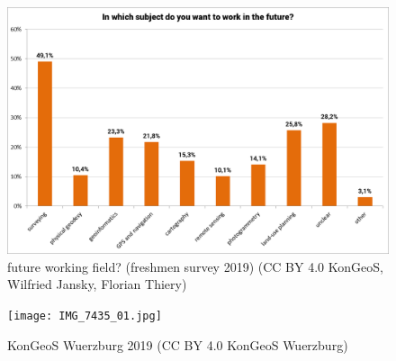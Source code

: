 \documentclass[a4paper]{article}
\begin{document}
\begin{figure}[!ht]
\begin{center}
\includegraphics[width=12cm]{wg-ys4.png}
\caption{future working field? (freshmen survey 2019) (CC BY 4.0 KonGeoS, Wilfried Jansky, Florian Thiery)}
\label{Abb7}
\end{center}
\end{figure}

\begin{figure}[!ht]
\begin{center}
\texttt{[image: IMG\_7435\_01.jpg]}
\caption{KonGeoS Wuerzburg 2019 (CC BY 4.0 KonGeoS Wuerzburg)}
\label{Abb8}
\end{center}
\end{figure}
\end{document}
